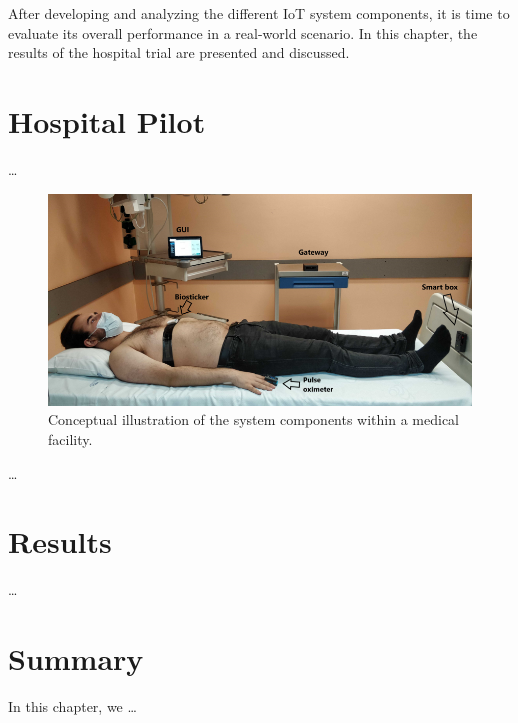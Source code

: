 After developing and analyzing the different \acs{IoT} system components, it is time to evaluate its overall performance in a real-world scenario.  In this chapter, the results of the hospital trial are presented and discussed. 

\section{Hospital Pilot}
\dots


\begin{figure}[H]
    \centering
    \includegraphics[width=\linewidth]{images/hospital-trial.png}
    \caption[Conceptual illustration of the system components within a medical facility.]{Conceptual illustration of the system components within a medical facility.}
    \label{fig:hospital-trial}
\end{figure}
\dots

\section{Results}
\dots

\section{Summary}
In this chapter, we \dots